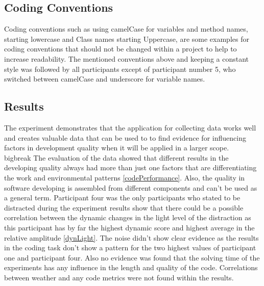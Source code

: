 \subsection{Coding Conventions}
Coding conventions such as using camelCase for variables and method names, starting lowercase and Class names starting Uppercase, are some examples for coding conventions that should not be changed within a project to help to increase readability. 
The mentioned conventions above and keeping a constant style was followed by all participants except of participant number 5, who switched between camelCase and underscore for variable names. 

\subsection{Results}
The experiment demonstrates that the application for collecting data works well and creates valuable data that can be used to to find evidence for influencing factors in development quality when it will be applied in a larger scope. 
\\bigbreak
The evaluation of the data showed that different results in the developing quality always had more than just one factors that are differentiating the work and environmental patterns \ref{codePerformance}. Also, the quality in software developing is assembled from different components and can't be used as a general term.
\bigbreak
Participant four was the only participants who stated to be distracted during the experiment results show that there could be a possible correlation between the dynamic changes in the light level of the distraction as this participant has by far the highest dynamic score and highest average in the relative amplitude \ref{dynLight}.
The noise didn't show clear evidence as the results in the coding task don't show a pattern for the two highest values of participant one and participant four. 
Also no evidence was found that the solving time of the experiments has any influence in the length and quality of the code.
Correlations between weather and any code metrics were not found within the results.  

\FloatBarrier

